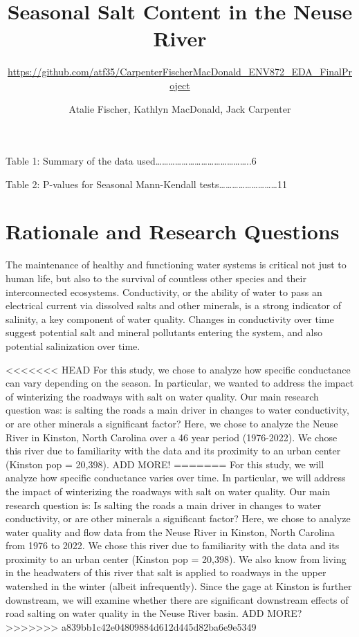 \documentclass[
  12pt,
]{article}
\title{Seasonal Salt Content in the Neuse River}
\subtitle{\url{https://github.com/atf35/CarpenterFischerMacDonald_ENV872_EDA_FinalProject}}
\author{Atalie Fischer, Kathlyn MacDonald, Jack Carpenter}
\date{}
\begin{document}
\maketitle

{
\setcounter{tocdepth}{2}
\tableofcontents
}
\newpage

\tableofcontents 
\newpage

\listoftables

Table 1: Summary of the data
used\ldots\ldots\ldots\ldots\ldots\ldots\ldots\ldots\ldots\ldots\ldots\ldots\ldots\ldots..6

Table 2: P-values for Seasonal Mann-Kendall
tests\ldots\ldots\ldots\ldots\ldots\ldots\ldots\ldots\ldots11 \newpage

\listoffigures 
\newpage

\hypertarget{rationale-and-research-questions}{%
\section{Rationale and Research
Questions}\label{rationale-and-research-questions}}

The maintenance of healthy and functioning water systems is critical not
just to human life, but also to the survival of countless other species
and their interconnected ecosystems. Conductivity, or the ability of
water to pass an electrical current via dissolved salts and other
minerals, is a strong indicator of salinity, a key component of water
quality. Changes in conductivity over time suggest potential salt and
mineral pollutants entering the system, and also potential salinization
over time.

\textless\textless\textless\textless\textless\textless\textless{} HEAD
For this study, we chose to analyze how specific conductance can vary
depending on the season. In particular, we wanted to address the impact
of winterizing the roadways with salt on water quality. Our main
research question was: is salting the roads a main driver in changes to
water conductivity, or are other minerals a significant factor? Here, we
chose to analyze the Neuse River in Kinston, North Carolina over a 46
year period (1976-2022). We chose this river due to familiarity with the
data and its proximity to an urban center (Kinston pop = 20,398). ADD
MORE! ======= For this study, we will analyze how specific conductance
varies over time. In particular, we will address the impact of
winterizing the roadways with salt on water quality. Our main research
question is: Is salting the roads a main driver in changes to water
conductivity, or are other minerals a significant factor? Here, we chose
to analyze water quality and flow data from the Neuse River in Kinston,
North Carolina from 1976 to 2022. We chose this river due to familiarity
with the data and its proximity to an urban center (Kinston pop =
20,398). We also know from living in the headwaters of this river that
salt is applied to roadways in the upper watershed in the winter (albeit
infrequently). Since the gage at Kinston is further downstream, we will
examine whether there are significant downstream effects of road salting
on water quality in the Neuse River basin. ADD MORE?
\textgreater\textgreater\textgreater\textgreater\textgreater\textgreater\textgreater{}
a839bb1c42e04809884d612d445d82ba6e9e5349
\end{document}
